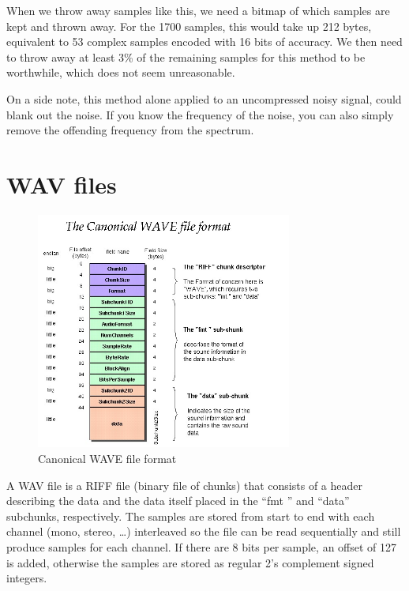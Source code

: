 \documentclass[a4paper,11pt]{article}
\begin{document}
When we throw away samples like this, we need a bitmap of which
samples are kept and thrown away. For the 1700 samples,
this would take up 212 bytes, equivalent to 53 complex
samples encoded with 16 bits of accuracy. We then need to throw away
at least 3\% of the remaining samples for this method to be worthwhile,
which does not seem unreasonable.


On a side note, this method alone applied to an uncompressed noisy
signal, could blank out the noise. If you know the frequency of
the noise, you can also simply remove the offending frequency from
the spectrum.


\section{WAV files}

\begin{figure}
\begin{center}
\includegraphics[width=0.75\textwidth]{wav-sound-format.jpg}
\end{center}
\caption{Canonical WAVE file format \cite{wav}}
\label{fig:wave}
\end{figure}

A WAV file is a RIFF file (binary file of chunks)
that consists of a header describing the data and the data itself
placed in the ``fmt '' and ``data'' subchunks, respectively.
The samples are stored from start to end with each channel (mono, stereo,
\ldots)
interleaved so the file can be read sequentially and still produce
samples for each channel. If there are 8 bits per sample, an offset of
127 is added, otherwise the samples are stored as regular 2's complement
signed integers.
\end{document}
